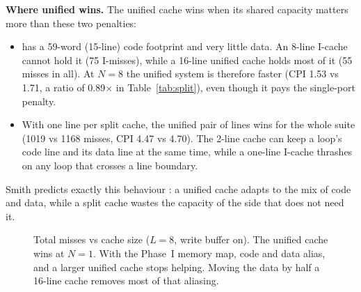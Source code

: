 \textbf{Where unified wins.} The unified cache wins when its shared capacity matters more than
these two penalties:
\begin{itemize}
  \item {} has a 59-word (15-line) code footprint and very little data. An 8-line
        I-cache cannot hold it (75 I-misses), while a 16-line unified cache holds most of it
        (55 misses in all). At $N=8$ the unified system is therefore faster (CPI 1.53 vs 1.71,
        a ratio of 0.89$\times$ in Table~\ref{tab:split}), even though it pays the single-port
        penalty.
  \item With one line per split cache, the unified pair of lines wins for the whole suite
        (1019 vs 1168 misses, CPI 4.47 vs 4.70). The 2-line cache can keep a loop's code line
        and its data line at the same time, while a one-line I-cache thrashes on any loop that
        crosses a line boundary.
\end{itemize}
Smith predicts exactly this behaviour \cite{smith1982}: a unified cache adapts to the mix of
code and data, while a split cache wastes the capacity of the side that does not need it.

\begin{figure}[t]
  \centering
  \caption{Total misses vs cache size ($L=8$, write buffer on). The unified cache wins at
  $N=1$. With the Phase~I memory map, code and data alias, and a larger unified cache stops
  helping. Moving the data by half a 16-line cache removes most of that aliasing.}
  \label{fig:size}
\end{figure}

